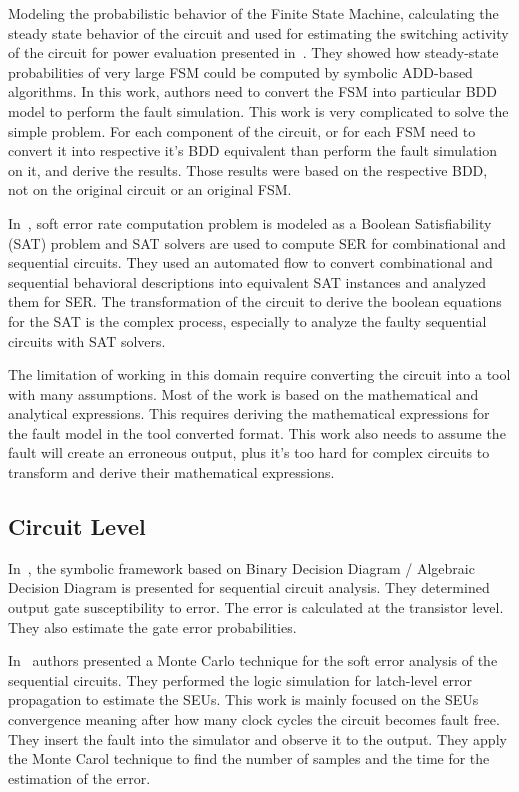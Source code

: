 Modeling the probabilistic behavior of the Finite State Machine, calculating the steady state
behavior of the circuit and used for estimating the switching activity of the circuit for
power evaluation presented in~\citep{hachtel1996markovian}. They showed how steady-state probabilities of very large FSM could be computed by
symbolic ADD-based algorithms. In this work, authors need to convert the FSM into particular BDD model to perform the fault simulation. This work is very complicated to solve the simple problem.  For each component of the circuit, or for each FSM need to convert it into respective it's BDD equivalent than perform the fault simulation on it, and derive the results. Those results were based on the respective BDD, not on the original circuit or an original FSM.

In~\citep{shazli2011high}, soft error rate  computation problem is modeled as a Boolean
Satisfiability (SAT) problem and SAT solvers are used to compute SER for combinational and
sequential circuits. They used an automated flow to convert combinational and sequential behavioral
descriptions into equivalent SAT instances and analyzed them for SER. The transformation of the circuit to derive the boolean equations for the SAT is the complex process, especially to analyze the faulty sequential circuits with SAT solvers.

The limitation of working in this domain require converting the circuit into a tool with many assumptions. Most of the work is based on the mathematical and analytical expressions. This requires deriving the mathematical expressions for the fault model in the tool converted format. This work also needs to assume the fault will create an erroneous output, plus it’s too hard for complex circuits to transform and derive their mathematical expressions.
\subsection{Circuit Level}

In~\citep{miskov2007mars}, the symbolic framework based on Binary Decision Diagram / Algebraic Decision
Diagram is presented for sequential circuit analysis. They determined output gate susceptibility to error. The error is calculated at the transistor level. They also estimate the gate error probabilities.

In~\citep{li2016monte} authors presented a  Monte Carlo technique for the soft error analysis of the sequential
circuits. They performed the logic simulation for latch-level error propagation to estimate the SEUs. This work is mainly focused on the SEUs convergence meaning after how many clock cycles the circuit becomes fault free.
They insert the fault into the simulator and observe it to the output. They apply the Monte Carol technique
to find the number of samples and the time for the estimation of the error.
  
